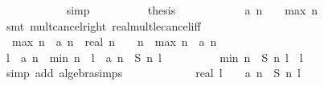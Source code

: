\begin{isabellebody}
\ \ \ \ \ \ \ \ \ \ \isamarkupfalse%
\ simp\isanewline
\ \ \ \ \ \ \ \ \isamarkupfalse%
\ {\isacharquery}thesis\isanewline
\ \ \ \ \ \ \ \ \ \ \isamarkupfalse%
\ {\isacharbackquoteopen}a\ {\isacharparenleft}n\ {\isacharminus}\ {}{\isacharparenright}\ {\isasymle}\ {\isacharquery}max\ {\isacharparenleft}n{\isacharminus}{}{\isacharparenright}{\isacharbackquoteclose}\isanewline
\ \ \ \ \ \ \ \ \ \ \isamarkupfalse%
\ {\isacharparenleft}smt\ mult{\isacharunderscore}cancel{\isacharunderscore}right\ real{\isacharunderscore}mult{\isacharunderscore}le{\isacharunderscore}cancel{\isacharunderscore}iff{}{\isacharparenright}\isanewline
\ \ \ \ \ \ \isamarkupfalse%
\isanewline
\ \ \ \ \ \ \isamarkupfalse%
\isanewline
\ \ \ \ \ \ \isamarkupfalse%
\ {}{\isacharcolon}\ {\isachardoublequoteopen}{\isacharquery}max\ n\ {\isacharminus}\ a\ {\isacharparenleft}n{\isacharminus}{}{\isacharparenright}\ {\isasymle}\ {\isacharparenleft}real\ n\ {\isacharminus}\ {}{\isacharparenright}\ {\isacharslash}\ n\ {\isacharasterisk}\ {\isacharparenleft}{\isacharquery}max\ {\isacharparenleft}n{\isacharminus}{}{\isacharparenright}\ {\isacharminus}\ a\ {\isacharparenleft}n{\isacharminus}{}{\isacharparenright}{\isacharparenright}{\isachardoublequoteclose}\isanewline
\ \ \ \ \ \ \ \ \isacommand{{\isachardot}}\isamarkupfalse%
\isanewline
\isanewline
\ \ \ \ \ \ \isamarkupfalse%
\ {\isachardoublequoteopen}l\ {\isacharasterisk}\ {\isacharparenleft}a\ {\isacharparenleft}n{\isacharminus}{}{\isacharparenright}\ {\isacharminus}\ {\isacharquery}min\ n{\isacharparenright}\ {\isacharequal}\ l\ {\isacharasterisk}\ a\ {\isacharparenleft}n{\isacharminus}{}{\isacharparenright}\ {\isacharminus}\ {\isacharquery}S\ n\ l{\isachardoublequoteclose}\isanewline
\ \ \ \ \ \ \ \ \isamarkupfalse%
\ {\isacharbackquoteopen}{\isacharquery}min\ n\ {\isacharequal}\ {\isacharquery}S\ n\ l\ {\isacharslash}\ l{\isacharbackquoteclose}\isanewline
\ \ \ \ \ \ \ \ \isamarkupfalse%
\ {\isacharparenleft}simp\ add{\isacharcolon}\ algebra{\isacharunderscore}simps{\isacharparenright}\ \isanewline
\ \ \ \ \ \ \isamarkupfalse%
\ \isamarkupfalse%
\ {\isachardoublequoteopen}{\isachardot}{\isachardot}{\isachardot}\ {\isacharequal}\ {\isacharparenleft}real\ l\ {\isacharminus}\ {}{\isacharparenright}\ {\isacharasterisk}\ a\ {\isacharparenleft}n{\isacharminus}{}{\isacharparenright}\ {\isacharminus}\ {\isacharquery}S\ {\isacharparenleft}n{\isacharminus}{}{\isacharparenright}\ {\isacharparenleft}l{\isacharminus}{}{\isacharparenright}{\isachardoublequoteclose}\isanewline

\end{isabellebody}
